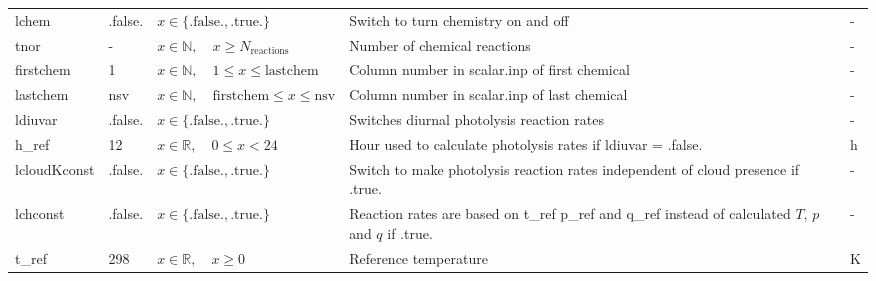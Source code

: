 \documentclass[twoside,11pt,fleqn,a4paper,english,openright]{report}
\begin{document}
\begin{center}
  \tablelasttail{
        &&&&\\\hline
  }
\begin{supertabular}{|l|p{1.6cm}|p{4cm}|p{6cm}|l|}
  lchem	& .false.	& $x\in\{\text{.false.},\text{.true.}\}$	& Switch to turn chemistry on and off & -\\
  tnor	& -	& $x \in \mathbb{N}, \quad x \ge N_{\text{reactions}}$	& Number of chemical reactions & -\\
  firstchem	& 1	& $x \in \mathbb{N}, \quad 1 \le x \le \text{lastchem}$	& Column number in scalar.inp of first chemical & -\\
  lastchem	& nsv	& $x \in \mathbb{N}, \quad \text{firstchem} \le x \le \text{nsv}$	& Column number in scalar.inp of last chemical & -\\
  ldiuvar & .false.	& $x\in\{\text{.false.},\text{.true.}\}$	& Switches diurnal photolysis reaction rates & -\\
  h\_ref	& 12	& $x \in \mathbb{R}, \quad 0 \leq x < 24$	& Hour used to calculate photolysis rates if ldiuvar = .false. & h\\
  lcloudKconst	& .false.	& $x\in\{\text{.false.},\text{.true.}\}$	& Switch to make photolysis reaction rates independent of cloud presence if .true. & -\\
  lchconst	& .false. & $x\in\{\text{.false.},\text{.true.}\}$	& Reaction rates are based on t\_ref p\_ref and q\_ref instead of calculated $T$, $p$ and $q$ if .true. & -\\
  t\_ref	& 298 & $x \in \mathbb{R}, \quad x \ge 0$	& Reference temperature	& K\\

\end{supertabular}
\end{center}
\end{document}
